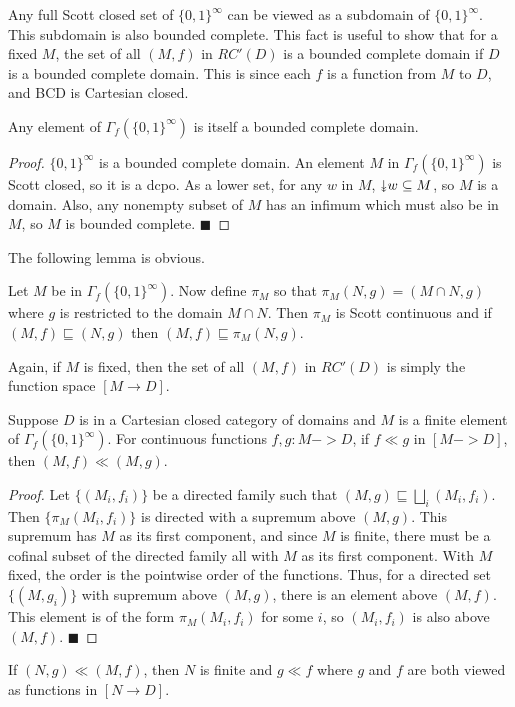Any full Scott closed set of $\{0,1\}^\infty$ can be viewed as a subdomain of $\{0,1\}^\infty$.  This subdomain is also bounded complete.  This fact is useful to show that for a fixed $M$, the set of all $(M,f)$ in $RC'(D)$ is a bounded complete domain if $D$ is a bounded complete domain.  This is since each $f$ is a function from $M$ to $D$, and \textsf{BCD} is Cartesian closed. 
\begin{lemma}
Any element of $\Gamma_{f}(\{0,1\}^\infty)$ is itself a bounded complete domain.
\end{lemma}
\begin{proof}
$\{0,1\}^\infty$ is a bounded complete domain.  An element $M$ in $\Gamma_{f}(\{0,1\}^\infty)$ is Scott closed, so it is a dcpo.  As a lower set, for any $w$ in $M$, $\Da w \subseteq M$, so $M$ is a domain.  Also, any nonempty subset of $M$ has an infimum which must also be in $M$, so $M$ is bounded complete.
\hfill $\blacksquare$
\end{proof}

The following lemma is obvious.
\begin{lemma}
Let $M$ be in $\Gamma_{f}(\{0,1\}^\infty)$.  Now define $\pi_M$ so that $\pi_M(N,g) = (M\cap N, g)$ where $g$ is restricted to the domain $M\cap N$.  Then $\pi_M$ is Scott continuous and if $(M,f) \sqsubseteq (N,g)$ then $(M,f) \sqsubseteq \pi_M(N,g)$.
\end{lemma}

Again, if $M$ is fixed, then the set of all $(M,f)$ in $RC'(D)$ is simply the function space $[M\to D]$.  
\begin{lemma}
Suppose $D$ is in a Cartesian closed category of domains and $M$ is a finite element of $\Gamma_{f}(\{0,1\}^\infty)$.  For continuous functions $f,g:M->D$, if $f\ll g$ in $[M->D]$, then $(M,f) \ll (M,g)$.
\end{lemma}
\begin{proof}
Let $\{(M_i,f_i)\}$ be a directed family such that $(M,g) \sqsubseteq \bigsqcup_i (M_i,f_i)$.  Then $\{\pi_M(M_i,f_i)\}$ is directed with a supremum above $(M,g)$.  This supremum has $M$ as its first component, and since $M$ is finite, there must be a cofinal subset of the directed family all with $M$ as its first component.  With $M$ fixed, the order is the pointwise order of the functions.  Thus, for a directed set $\{(M,g_i)\}$ with supremum above $(M,g)$, there is an element above $(M,f)$.  This element is of the form $\pi_M(M_i,f_i)$ for some $i$, so $(M_i,f_i)$ is also above $(M,f)$.
\hfill $\blacksquare$
\end{proof}
\begin{corollary}
If $(N,g)\ll (M,f)$, then $N$ is finite and $g\ll f$ where $g$ and $f$ are both viewed as functions in $[N\to D]$.
\end{corollary}

